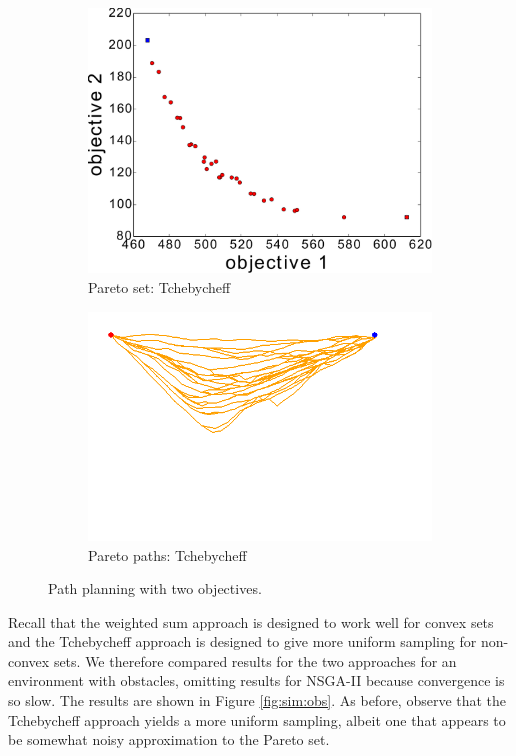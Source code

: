 \documentclass{article}
\begin{document}
\begin{figure}
\begin{subfigure}[b]{0.45\linewidth}
		\includegraphics[width=\textwidth]{fig/sim2-2obj/PF02-MORRT2.pdf}
		\caption{Pareto set: Tchebycheff}
		\label{fig:sim:norm:pf:c}
	\end{subfigure} 
	\begin{subfigure}[b]{0.45\linewidth}
		\centering
		\includegraphics[width=\textwidth]{fig/sim2-2obj/MORRTstar00-ALL.png}
		\caption{Pareto paths: Tchebycheff}
		\label{fig:sim:norm:sols:c}
	\end{subfigure}
	\caption{Path planning with two objectives.}
	\label{fig:sim:norm}
\end{figure}

Recall that the weighted sum approach is designed to work well for convex sets and the Tchebycheff approach is designed to give more uniform sampling for non-convex sets. 
We therefore compared results for the two approaches for an environment with obstacles, omitting results for NSGA-II because convergence is so slow.  
The results are shown in Figure \ref{fig:sim:obs}.
As before, observe that the Tchebycheff approach yields a more uniform sampling, albeit one that appears to be somewhat noisy approximation to the Pareto set.
\end{document}
